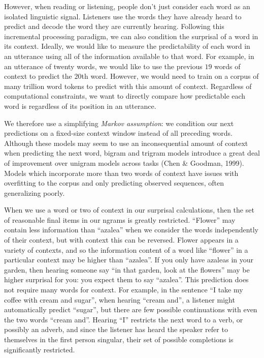 \documentclass[
  english,
  man,floatsintext]{apa6}
\begin{document}
However, when reading or listening, people don't just consider each word as an isolated linguistic signal. Listeners use the words they have already heard to predict and decode the word they are currently hearing. Following this incremental processing paradigm, we can also condition the surprisal of a word in its context. Ideally, we would like to measure the predictability of each word in an utterance using all of the information available to that word. For example, in an utterance of twenty words, we would like to use the previous \(19\) words of context to predict the \(20\)th word. However, we would need to train on a corpus of many trillion word tokens to predict with this amount of context. Regardless of computational constraints, we want to directly compare how predictable each word is regardless of its position in an utterance.

We therefore use a simplifying \emph{Markov assumption}: we condition our next predictions on a fixed-size context window instead of all preceding words. Although these models may seem to use an inconsequential amount of context when predicting the next word, bigram and trigram models introduce a great deal of improvement over unigram models across tasks (Chen \& Goodman, 1999). Models which incorporate more than two words of context have issues with overfitting to the corpus and only predicting observed sequences, often generalizing poorly.

When we use a word or two of context in our surprisal calculations, then the set of reasonable final items in our ngrams is greatly restricted. ``Flower'' may contain less information than ``azalea'' when we consider the words independently of their context, but with context this can be reversed. Flower appears in a variety of contexts, and so the information content of a word like ``flower'' in a particular context may be higher than ``azalea''. If you only have azaleas in your garden, then hearing someone say ``in that garden, look at the flowers'' may be higher surprisal for you: you expect them to say ``azalea''. This prediction does not require many words for context. For example, in the sentence ``I take my coffee with cream and sugar'', when hearing ``cream and'', a listener might automatically predict ``sugar'', but there are few possible continuations with even the two words ``cream and''. Hearing ``I'' restricts the next word to a verb, or possibly an adverb, and since the listener has heard the speaker refer to themselves in the first person singular, their set of possible completions is significantly restricted.
\end{document}
